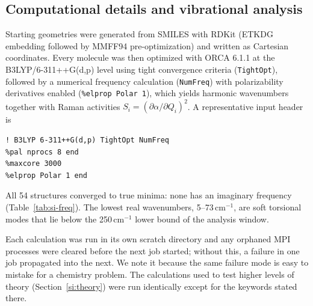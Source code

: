 \documentclass[11pt]{article}
\newcommand*\wn{\ensuremath{\text{cm}^{-1}}}
\begin{document}
\subsection{Computational details and vibrational analysis}
\label{si:compdetails}

Starting geometries were generated from SMILES with RDKit (ETKDG embedding followed by
MMFF94 pre-optimization) and written as Cartesian coordinates. Every molecule was then
optimized with ORCA 6.1.1 at the B3LYP/6-311++G(d,p) level using tight convergence
criteria (\texttt{TightOpt}), followed by a numerical frequency calculation
(\texttt{NumFreq}) with polarizability derivatives enabled (\texttt{\%elprop Polar 1}),
which yields harmonic wavenumbers together with Raman activities
$S_i = (\partial\alpha/\partial Q_i)^2$. A representative input header is

\begin{verbatim}
! B3LYP 6-311++G(d,p) TightOpt NumFreq
%pal nprocs 8 end
%maxcore 3000
%elprop Polar 1 end
\end{verbatim}

All 54 structures converged to true minima: none has an imaginary frequency
(Table~\ref{tab:si-freq}). The lowest real wavenumbers, 5--73\,\wn{}, are soft torsional
modes that lie below the 250\,\wn{} lower bound of the analysis window.

Each calculation was run in its own scratch directory and any orphaned MPI processes were
cleared before the next job started; without this, a failure in one job propagated into
the next. We note it because the same failure mode is easy to mistake for a chemistry
problem. The calculations used to test higher levels of theory
(Section~\ref{si:theory}) were run identically except for the keywords stated there.
\end{document}
